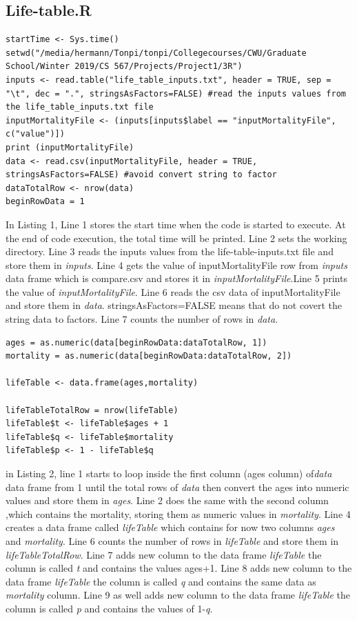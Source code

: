 \documentclass[12pt]{article}
\begin{document}
\subsection{Life-table.R}
\begin{lstlisting}[caption={ Reading The Data Part 1},captionpos=b]
startTime <- Sys.time()
setwd("/media/hermann/Tonpi/tonpi/Collegecourses/CWU/Graduate School/Winter 2019/CS 567/Projects/Project1/3R")
inputs <- read.table("life_table_inputs.txt", header = TRUE, sep = "\t", dec = ".", stringsAsFactors=FALSE) #read the inputs values from the life_table_inputs.txt file
inputMortalityFile <- (inputs[inputs$label == "inputMortalityFile", c("value")])
print (inputMortalityFile)
data <- read.csv(inputMortalityFile, header = TRUE, stringsAsFactors=FALSE) #avoid convert string to factor
dataTotalRow <- nrow(data)
beginRowData = 1
\end{lstlisting}
In Listing 1, Line 1 stores the start time when the code is started to execute. At the end of code execution, the total time will be printed. Line 2 sets the working directory. Line 3 reads the inputs values from the life-table-inputs.txt file and store them in \textit{inputs}. Line 4 gets the value of inputMortalityFile row from \textit{inputs} data frame which is compare.csv and stores it in \textit{inputMortalityFile}.Line 5 prints the value of \textit{inputMortalityFile}. Line 6 reads the csv data of inputMortalityFile and store them in \textit{data}. stringsAsFactors=FALSE means that do not covert the string data to factors. Line 7 counts the number of rows in \textit{data}.
\begin{lstlisting}[caption={ Reading The Data Part 2},captionpos=b]
ages = as.numeric(data[beginRowData:dataTotalRow, 1])
mortality = as.numeric(data[beginRowData:dataTotalRow, 2])

lifeTable <- data.frame(ages,mortality)

lifeTableTotalRow = nrow(lifeTable)
lifeTable$t <- lifeTable$ages + 1
lifeTable$q <- lifeTable$mortality
lifeTable$p <- 1 - lifeTable$q
\end{lstlisting}
in Listing 2, line 1 starts to loop inside the first column (ages column) of\textit{data} data frame from 1 until the total rows of \textit{data} then convert the ages into numeric values and store them in \textit{ages}. Line 2 does the same with the second column ,which contains the mortality, storing them as numeric values in \textit{mortality}. Line 4 creates a data frame called \textit{lifeTable} which contains for now two columns \textit{ages} and \textit{mortality}. Line 6 counts the number of rows in \textit{lifeTable} and store them in \textit{lifeTableTotalRow}. Line 7 adds new column to the data frame \textit{lifeTable} the column is called \textit{t} and contains the values ages+1. Line 8 adds new column to the data frame \textit{lifeTable} the column is called \textit{q} and contains the same data as \textit{mortality} column. Line 9 as well adds new column to the data frame \textit{lifeTable} the column is called \textit{p} and contains the values of 1-\textit{q}.
\end{document}
